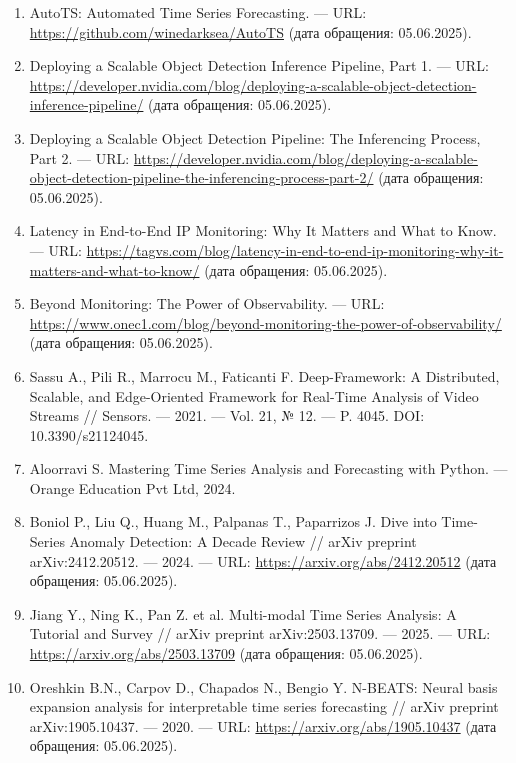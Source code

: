 \begin{enumerate}[label=\arabic*)\hspace{1em}, leftmargin=1cm, itemsep=0em]
	\item AutoTS: Automated Time Series Forecasting. — URL: \url{https://github.com/winedarksea/AutoTS} (дата обращения: 05.06.2025).
	\item Deploying a Scalable Object Detection Inference Pipeline, Part 1. — URL: \url{https://developer.nvidia.com/blog/deploying-a-scalable-object-detection-inference-pipeline/} (дата обращения: 05.06.2025).
	\item Deploying a Scalable Object Detection Pipeline: The Inferencing Process, Part 2. — URL: \url{https://developer.nvidia.com/blog/deploying-a-scalable-object-detection-pipeline-the-inferencing-process-part-2/} (дата обращения: 05.06.2025).
	\item Latency in End-to-End IP Monitoring: Why It Matters and What to Know. — URL: \url{https://tagvs.com/blog/latency-in-end-to-end-ip-monitoring-why-it-matters-and-what-to-know/} (дата обращения: 05.06.2025).
	\item Beyond Monitoring: The Power of Observability. — URL: \url{https://www.onec1.com/blog/beyond-monitoring-the-power-of-observability/} (дата обращения: 05.06.2025).
	\item Sassu A., Pili R., Marrocu M., Faticanti F. Deep-Framework: A Distributed, Scalable, and Edge-Oriented Framework for Real-Time Analysis of Video Streams // Sensors. — 2021. — Vol. 21, № 12. — P. 4045. DOI: 10.3390/s21124045.
	\item Aloorravi S. Mastering Time Series Analysis and Forecasting with Python. — Orange Education Pvt Ltd, 2024.
	\item Boniol P., Liu Q., Huang M., Palpanas T., Paparrizos J. Dive into Time-Series Anomaly Detection: A Decade Review // arXiv preprint arXiv:2412.20512. — 2024. — URL: \url{https://arxiv.org/abs/2412.20512} (дата обращения: 05.06.2025).
	\item Jiang Y., Ning K., Pan Z. et al. Multi-modal Time Series Analysis: A Tutorial and Survey // arXiv preprint arXiv:2503.13709. — 2025. — URL: \url{https://arxiv.org/abs/2503.13709} (дата обращения: 05.06.2025).
	\item Oreshkin B.N., Carpov D., Chapados N., Bengio Y. N-BEATS: Neural basis expansion analysis for interpretable time series forecasting // arXiv preprint arXiv:1905.10437. — 2020. — URL: \url{https://arxiv.org/abs/1905.10437} (дата обращения: 05.06.2025).
\end{enumerate}